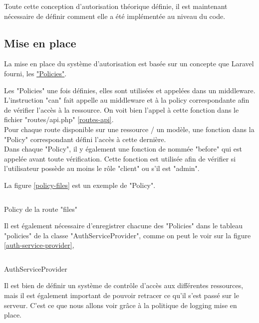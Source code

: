 \documentclass[
    iai, %
    il, %
]{heig-tb}
\begin{document}
Toute cette conception d'autorisation théorique définie, il est maintenant nécessaire de définir comment elle a été implémentée au niveau du code.

\subsection{Mise en place}
La mise en place du système d'autorisation est basée sur un concepte que Laravel fourni, les \href{https://laravel.com/docs/9.x/authorization#creating-policies}{"Policies"}.

Les "Policies" une fois définies, elles sont utilisées et appelées dans un middleware. L'instruction "can" fait appelle au middleware et à la policy correspondante afin de vérifier l'accès à la ressource. On voit bien l'appel à cette fonction dans le fichier "routes/api.php" \ref{routes-api}. \\
Pour chaque route disponible sur une ressource / un modèle, une fonction dans la "Policy" correspondant défini l'accès à cette dernière. \\
Dans chaque "Policy", il y également une fonction de nommée "before" qui est appelée avant toute vérification. Cette fonction est utilisée afin de vérifier si l'utilisateur possède au moins le rôle "client" ou s'il est "admin".

La figure \ref{policy-files} est un exemple de "Policy".

\begin{listing}[h]
    \inputminted{php}{assets/code/FilePolicy.php}
    \caption{Policy de la route "files" \label{policy-files}}
\end{listing}

Il est également nécessaire d'enregistrer chacune des "Policies" dans le tableau "policies" de la classe "AuthServiceProvider", comme on peut le voir sur la figure \ref{auth-service-provider},

\begin{listing}[h]
    \inputminted{php}{assets/code/FilePolicy.php}
    \caption{AuthServiceProvider \label{auth-service-provider}}
\end{listing}

Il est bien de définir un système de contrôle d'accès aux différentes ressources, mais il est également important de pouvoir retracer ce qu'il s'est passé sur le serveur. C'est ce que nous allons voir grâce à la politique de logging mise en place.
\end{document}
